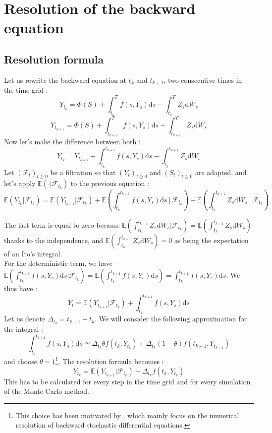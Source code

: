 \documentclass[a4paper,11pt,english]{book}
\begin{document}
\section{Resolution of the backward equation}
\subsection{Resolution formula}
Let us rewrite the backward equation at $t_{k}$ and $t_{k+1}$, two consecutive times in the time grid :
$$Y_{t_{k}} = \Phi(S) + \int_{t_{k}}^{T} f(s,Y_{s}) \text{d}s - \int_{t_{k}}^{T} Z_{s} \text{d}W_{s}$$
$$Y_{t_{k+1}} = \Phi(S) + \int_{t_{k+1}}^{T} f(s,Y_{s}) \text{d}s - \int_{t_{k+1}}^{T} Z_{s} \text{d}W_{s}$$
Now let's make the difference between both :
\begin{equation}
    Y_{t_{k}} = Y_{t_{k+1}} + \int_{t_{k}}^{t_{k+1}} f(s,Y_{s}) \text{d}s - \int_{t_{k}}^{t_{k+1}}Z_{s} \text{d}W_{s}
    \label{eq:Y_t}
\end{equation}
Let $(\mathcal{F}_{t})_{t\geq0}$ be a filtration so that $(Y_{t})_{t\geq0}$ and $(S_{t})_{t\geq0}$ are adapted, and let's apply $\mathbb{E}(\cdot|\mathcal{F}_{t_{k}})$ to the previous equation :
$$\mathbb{E}(Y_{t_{k}}|\mathcal{F}_{t_{k}}) = \mathbb{E}(Y_{t_{k+1}}|\mathcal{F}_{t_{k}}) + \mathbb{E}\left(\int_{t_{k}}^{t_{k+1}} f(s,Y_{s}) \text{d}s~\bigg\vert~\mathcal{F}_{t_{k}}\right) - \mathbb{E}\left(\int_{t_{k}}^{t_{k+1}}Z_{s} \text{d}W_{s}~\bigg\vert~\mathcal{F}_{t_{k}}\right)$$

The last term is equal to zero because $\mathbb{E}\left(\int_{t_{k}}^{t_{k+1}}Z_{s} \text{d}W_{s}|\mathcal{F}_{t_{k}}\right)=\mathbb{E}\left(\int_{t_{k}}^{t_{k+1}}Z_{s} \text{d}W_{s}\right)$ thanks to the independence, and $\mathbb{E}\left(\int_{t_{k}}^{t_{k+1}}Z_{s} \text{d}W_{s}\right)=0$ as being the expectation of an Ito's integral.\\
For the deterministic term, we have $\mathbb{E}\left(\int_{t_{k}}^{t_{k+1}}f(s,Y_{s}) \text{d}s|\mathcal{F}_{t_{k}}\right)=\mathbb{E}\left(\int_{t_{k}}^{t_{k+1}}f(s,Y_{s}) \text{d}s\right) = \int_{t_{k}}^{t_{k+1}}f(s,Y_{s}) \text{d}s$.
We thus have :
\begin{equation}
    Y_t = \mathbb{E}(Y_{t_{k+1}}|\mathcal{F}_{t_{k}}) + \int_{t_{k}}^{t_{k+1}}f(s,Y_{s}) \text{d}s
\end{equation}
Let us denote $\Delta_{t_k}=t_{k+1}-t_{k}$. We will consider the following approximation for the integral :
$$\int_{t_{k}}^{t_{k+1}}f(s,Y_{s}) \text{d}s \simeq \Delta_{t_{k}}\theta f(t_{k},Y_{t_{k}}) + \Delta_{t_{k}}(1-\theta) f(t_{k+1},Y_{t_{k+1}})$$
and choose $\theta=1$\footnote{This choice has been motivated by \cite{gobet2005regression}, which mainly focus on the numerical resolution of backward stochastic differential equations.}. The resolution formula becomes :
\begin{equation}
Y_{t_{k}} = \mathbb{E}(Y_{t_{k+1}}|\mathcal{F}_{t_{k}}) + \Delta_{t_{k}}f(t_{k},Y_{t_{k}})
\label{resolutionFormula}
\end{equation}
This has to be calculated for every step in the time grid and for every simulation of the Monte Carlo method.
\end{document}

